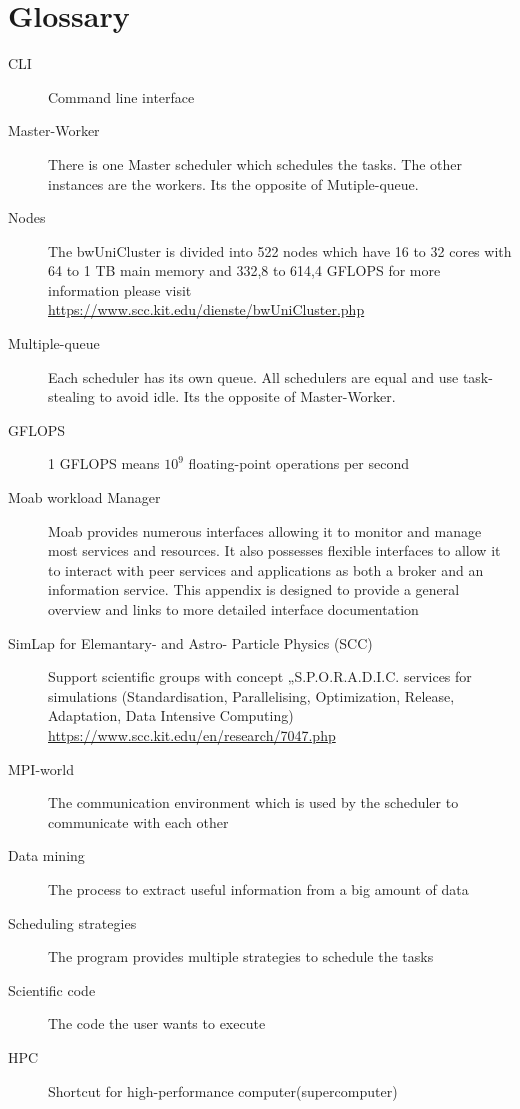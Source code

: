 \section{Glossary}
\begin{description}
	\item[CLI] Command line interface
	
	\item[Master-Worker] There is one Master scheduler which schedules the tasks. The other instances are the workers. Its the opposite of Mutiple-queue.

	\item[Nodes] The bwUniCluster is divided into 522 nodes which have 16 to 32 cores with 64 to 1 TB main memory and 332,8 to 614,4 GFLOPS for more information please visit \href{https://www.scc.kit.edu/dienste/bwUniCluster.php}{https://www.scc.kit.edu/dienste/bwUniCluster.php}

	\item[Multiple-queue]Each scheduler has its own queue. All schedulers are equal and use task-stealing to avoid idle. Its the opposite of Master-Worker.

	\item[GFLOPS] 1 GFLOPS means $10^9$ floating-point operations per second

	\item[Moab workload Manager] Moab provides numerous interfaces allowing it to monitor and manage most services and resources. It also possesses flexible interfaces to allow it to interact with peer services and applications as both a broker and an information service. This appendix is designed to provide a general overview and links to more detailed interface documentation

	\item [SimLap for Elemantary- and Astro-    Particle Physics (SCC)] Support scientific groups with concept „S.P.O.R.A.D.I.C. services for simulations (Standardisation, Parallelising, Optimization, Release, Adaptation, Data Intensive Computing) \href {https://www.scc.kit.edu/en/research/7047.php}{https://www.scc.kit.edu/en/research/7047.php}

	\item[MPI-world] The communication environment which is used by the scheduler to communicate with each other 

	\item[Data mining] The process to extract useful information from a big amount of data

	\item[Scheduling strategies] The program provides multiple strategies to schedule the tasks

	\item[Scientific code] The code the user wants to execute
	
	\item[HPC] Shortcut for high-performance computer(supercomputer)
\end{description}